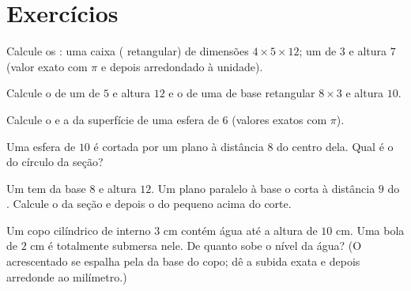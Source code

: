\section{Exercícios}

\begin{exercise}[$\star$]\label{exo:g9:solids:1}
Calcule os : uma caixa ( retangular) de dimensões
$4 \times 5 \times 12$; um  de  $3$ e altura $7$ (valor
exato com $\pi$ e depois arredondado à unidade).
\end{exercise}

\begin{exercise}[$\star$]\label{exo:g9:solids:2}
Calcule o  de um  de  $5$ e altura $12$ e o de uma
 de base retangular $8 \times 3$ e altura $10$.
\end{exercise}

\begin{exercise}[$\star$]\label{exo:g9:solids:3}
Calcule o  e a  da superfície de uma esfera de  $6$
(valores exatos com $\pi$).
\end{exercise}

\begin{exercise}[$\star$]\label{exo:g9:solids:4}
Uma esfera de  $10$ é cortada por um plano à distância $8$ do
centro dela. Qual é o  do círculo da seção?
\end{exercise}

\begin{exercise}[$\star\star$]\label{exo:g9:solids:5}
Um  tem  da base $8$ e altura $12$. Um plano paralelo à base o
corta à distância $9$ do . Calcule o  da seção e depois o
 do  pequeno acima do corte.
\end{exercise}

\begin{exercise}[$\star\star$]\label{exo:g9:solids:6}
Um copo cilíndrico de  interno $3$ cm contém água até a altura de
$10$ cm. Uma bola de  $2$ cm é totalmente submersa nele. De quanto
sobe o nível da água? (O  acrescentado se espalha pela  da
base do copo; dê a subida exata e depois arredonde ao milímetro.)
\end{exercise}


